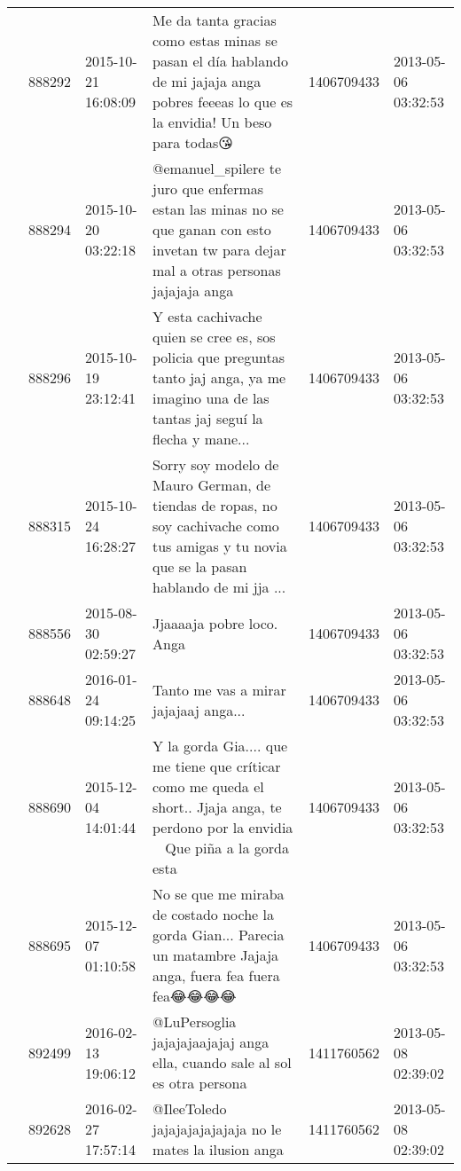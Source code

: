 \begin{tabular}{llllrl}
           & 888292  & 2015-10-21 16:08:09 &      Me da tanta gracias como estas minas se pasan el día hablando de mi jajaja anga pobres feeeas lo que es la envidia! Un beso para todas😘 &  1406709433 & 2013-05-06 03:32:53 \\
           & 888294  & 2015-10-20 03:22:18 &      @emanuel\_spilere te juro que enfermas estan las minas no se que ganan con esto invetan tw para dejar mal a otras personas jajajaja anga &  1406709433 & 2013-05-06 03:32:53 \\
           & 888296  & 2015-10-19 23:12:41 &  Y esta cachivache quien se cree es, sos policia que preguntas tanto jaj anga, ya me imagino una de las tantas jaj seguí la flecha y mane... &  1406709433 & 2013-05-06 03:32:53 \\
           & 888315  & 2015-10-24 16:28:27 &  Sorry soy modelo de Mauro German,  de tiendas de ropas, no soy cachivache como tus amigas y tu novia que se la pasan hablando de mi jja ... &  1406709433 & 2013-05-06 03:32:53 \\
           & 888556  & 2015-08-30 02:59:27 &                                                                                                                    Jjaaaaja pobre loco. Anga &  1406709433 & 2013-05-06 03:32:53 \\
           & 888648  & 2016-01-24 09:14:25 &                                                                                                        Tanto me vas a mirar jajajaaj anga... &  1406709433 & 2013-05-06 03:32:53 \\
           & 888690  & 2015-12-04 14:01:44 &     Y la gorda Gia.... que me tiene que críticar como me queda el short.. Jjaja anga, te perdono por la envidia👋👼 Que piña a la gorda esta👊👊 &  1406709433 & 2013-05-06 03:32:53 \\
           & 888695  & 2015-12-07 01:10:58 &                               No se que me miraba de costado noche la gorda Gian... Parecia un matambre Jajaja anga, fuera fea fuera fea😂😂😂😂 &  1406709433 & 2013-05-06 03:32:53 \\
           & 892499  & 2016-02-13 19:06:12 &                                                                    @LuPersoglia jajajajaajajaj anga ella, cuando sale al sol es otra persona &  1411760562 & 2013-05-08 02:39:02 \\
           & 892628  & 2016-02-27 17:57:14 &                                                                                     @IleeToledo jajajajajajajaja no le mates la ilusion anga &  1411760562 & 2013-05-08 02:39:02 \\

\end{tabular}
